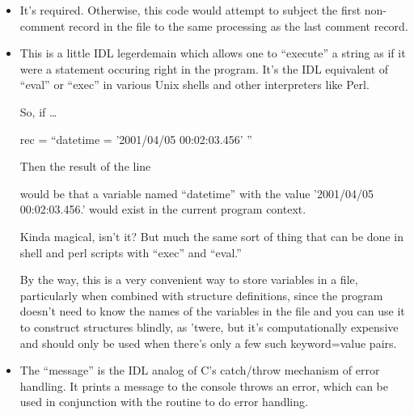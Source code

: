 \begin{itemize}
      \be
      \item {}

        It's required. Otherwise, this code would attempt to subject
        the first non-comment record in the file to the same
        processing as the last comment record.

      \item {}
        
        This is a little IDL legerdemain which allows one to
        ``execute'' a string as if it were a statement occuring right
        in the program. It's the IDL equivalent of ``eval'' or
        ``exec'' in various Unix shells and other interpreters like
        Perl.

        So, if \ldots

        rec = ``datetime = '2001/04/05 00:02:03.456' ''

        Then the result of the line 


        would be that a variable named ``datetime'' with the value
        '2001/04/05 00:02:03.456.' would exist in the current program
        context. 

        Kinda magical, isn't it? But much the same sort of thing that
        can be done in shell and perl scripts with ``exec'' and
        ``eval.''

        By the way, this is a very convenient way to store variables
        in a file, particularly when combined with structure
        definitions, since the program doesn't need to know  the names of the variables in the file and you can use
        it to construct structures blindly, as 'twere, but it's
        computationally expensive and should only be used when there's
        only a few such keyword=value pairs.

        \item {}

        The ``message'' is the IDL analog of C's catch/throw mechanism
        of error handling. It prints a message to the console
         throws an error, which can be used in conjunction
        with the  routine to do error handling.

      \ee

    \end{itemize}


